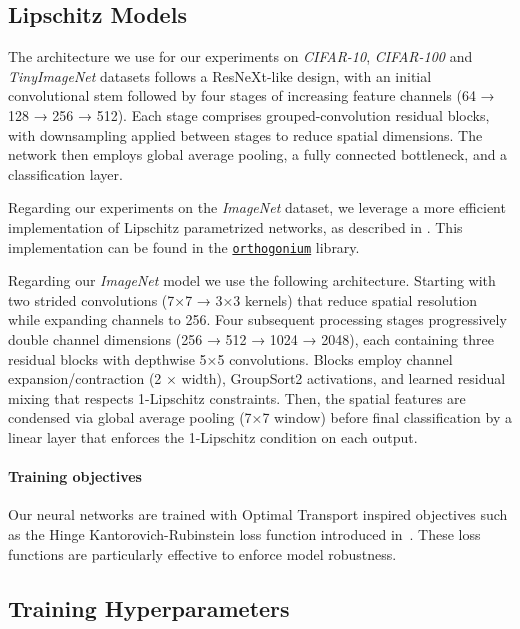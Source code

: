 \subsection{Lipschitz Models}
\label{app:model_implementation}

The architecture we use for our experiments on \textsl{CIFAR-10}, \textsl{CIFAR-100} and \textsl{TinyImageNet} datasets follows a ResNeXt-like design, with an initial convolutional stem followed by four stages of increasing feature channels (64 → 128 → 256 → 512). Each stage comprises grouped-convolution residual blocks, with downsampling applied between stages to reduce spatial dimensions. The network then employs global average pooling, a fully connected bottleneck, and a classification layer. 


Regarding our experiments on the \textsl{ImageNet} dataset, we leverage a more efficient implementation of Lipschitz parametrized networks, as described in \cite{boissin2025adaptiveorthogonalconvolutionscheme}. This implementation can be found in the \href{https://github.com/deel-ai/orthogonium}{\texttt{orthogonium}} library.

Regarding our \textsl{ImageNet} model we use the following architecture. Starting with two strided convolutions (7×7 → 3×3 kernels) that reduce spatial resolution while expanding channels to 256. Four subsequent processing stages progressively double channel dimensions (256 → 512 → 1024 → 2048), each containing three residual blocks with depthwise 5×5 convolutions. Blocks employ channel expansion/contraction (2 × width), GroupSort2 activations, and learned residual mixing that respects 1-Lipschitz constraints. Then, the spatial features are condensed via global average pooling (7×7 window) before final classification by a linear layer that enforces the 1-Lipschitz condition on each output. 

\paragraph{Training objectives} Our neural networks are trained with Optimal Transport inspired objectives such as the Hinge Kantorovich-Rubinstein loss function introduced in~\cite{acheivingrobustness}. These loss functions are particularly effective to enforce model robustness.

\subsection{Training Hyperparameters}

